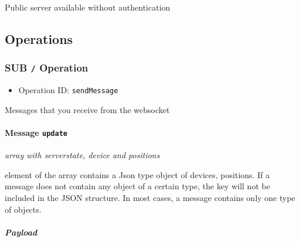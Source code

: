 \documentclass[
]{article}
\providecommand{\tightlist}{%
  \setlength{\itemsep}{0pt}\setlength{\parskip}{0pt}}
\begin{document}
Public server available without authentication

\hypertarget{operations}{%
\subsection{Operations}\label{operations}}

\hypertarget{sub-operation}{%
\subsubsection{\texorpdfstring{SUB \texttt{/}
Operation}{SUB / Operation}}\label{sub-operation}}

\begin{itemize}
\tightlist
\item
  Operation ID: \texttt{sendMessage}
\end{itemize}

Messages that you receive from the websocket

\hypertarget{message-update}{%
\paragraph{\texorpdfstring{Message
\texttt{update}}{Message update}}\label{message-update}}

\emph{array with serverstate, device and positions}

element of the array contains a Json type object of devices, positions.
If a message does not contain any object of a certain type, the key will
not be included in the JSON structure. In most cases, a message contains
only one type of objects.

\hypertarget{payload}{%
\subparagraph{Payload}\label{payload}}
\end{document}
